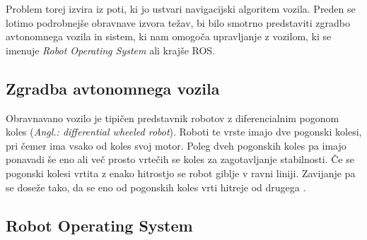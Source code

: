 \documentclass[10pt,a4paper]{article}
\begin{document}
Problem torej izvira iz poti, ki jo ustvari navigacijski algoritem vozila. Preden se lotimo podrobnejše obravnave izvora težav, bi bilo smotrno predstaviti zgradbo avtonomnega vozila in sistem, ki nam omogoča upravljanje z vozilom, ki se imenuje \textit{Robot Operating System} ali krajše ROS.

\subsection{Zgradba avtonomnega vozila}

Obravnavano vozilo je tipičen predstavnik robotov z diferencialnim pogonom koles (\textit{Angl.: differential wheeled robot}).
Roboti te vrste imajo dve pogonski kolesi, pri čemer ima vsako od koles svoj motor. Poleg dveh pogonskih koles pa imajo ponavadi še eno ali več prosto vrtečih se koles za zagotavljanje stabilnosti. Če se pogonski kolesi vrtita z enako hitrostjo se robot giblje v ravni liniji. Zavijanje pa se doseže tako, da se eno od pogonskih koles vrti hitreje od drugega \cite{vir1}. %


\subsection{Robot Operating System}
\end{document}
